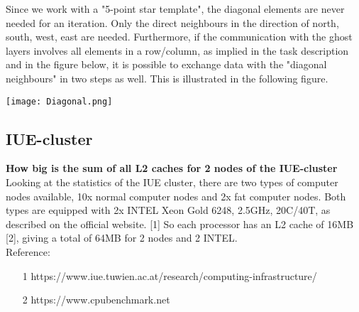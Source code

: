 \documentclass[10pt,a4paper]{article}
\begin{document}
Since we work with a "5-point star template", the diagonal elements are never needed for an iteration. Only the 
direct neighbours in the direction of north, south, west, east are needed. Furthermore, if the communication with 
the ghost layers involves all elements in a row/column, as implied in the task description and in the figure below, 
it is possible to exchange data with the "diagonal neighbours" in two steps as well. This is illustrated in the 
following figure. \\


\begin{center}
\texttt{[image: Diagonal.png]}
\end{center}

\subsection{IUE-cluster}
\textbf{How big is the sum of all L2 caches for 2 nodes of the IUE-cluster }\\


Looking at the statistics of the IUE cluster, there are two types of computer nodes available, 10x normal 
computer nodes and 2x fat computer nodes. Both types are equipped with 2x INTEL Xeon Gold 6248, 2.5GHz, 20C/40T, 
as described on the official website. [1] So each processor has an L2 cache of 16MB [2], giving a total of 64MB 
for 2 nodes and 2 INTEL. \\


Reference:
\begin{enumerate}
    \item [1] https://www.iue.tuwien.ac.at/research/computing-infrastructure/
    \item [2] https://www.cpubenchmark.net
\end{enumerate}
\end{document}
